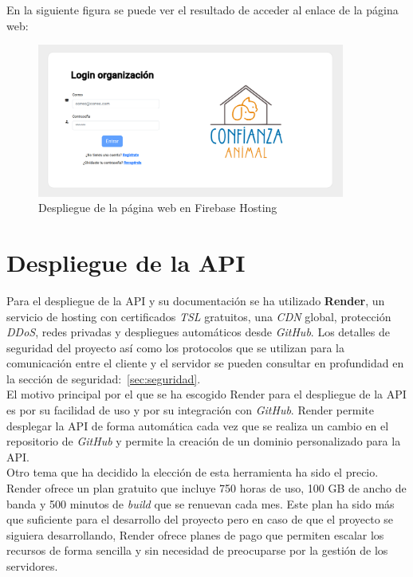 En la siguiente figura se puede ver el resultado de acceder al enlace de la página web: \\

\begin{figure}[H]
    \centering
    \includegraphics[width=0.9\textwidth]{imgs/despliegue-web.png}
    \caption{Despliegue de la página web en Firebase Hosting}
    \label{fig:firebase-hosting}
\end{figure}

\section{Despliegue de la API}\label{sec:despliegue-de-la-api}

Para el despliegue de la API y su documentación se ha utilizado \textbf{Render}, un servicio de hosting con certificados \textit{TSL}
gratuitos, una \textit{CDN} global, protección \textit{DDoS}, redes privadas y despliegues automáticos desde \textit{GitHub}.
Los detalles de seguridad del proyecto así como los protocolos que se utilizan para la comunicación entre el cliente y el servidor
se pueden consultar en profundidad en la sección de seguridad:~\ref{sec:seguridad}. \\

El motivo principal por el que se ha escogido Render para el despliegue de la API es por su facilidad de uso y por su
integración con \textit{GitHub}. Render permite desplegar la API de forma automática cada vez que se realiza un cambio
en el repositorio de \textit{GitHub} y permite la creación de un dominio personalizado para la API. \\

Otro tema que ha decidido la elección de esta herramienta ha sido el precio. Render ofrece un plan gratuito que incluye
750 horas de uso, 100 GB de ancho de banda y 500 minutos de \textit{build} que se renuevan cada mes. Este plan ha sido
más que suficiente para el desarrollo del proyecto pero en caso de que el proyecto se siguiera desarrollando, Render
ofrece planes de pago que permiten escalar los recursos de forma sencilla y sin necesidad de preocuparse por la
gestión de los servidores. \\

